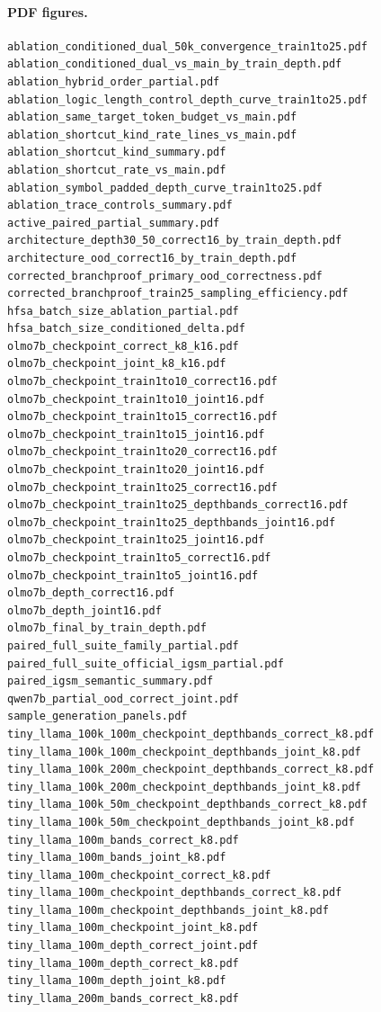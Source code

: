 \documentclass[10pt]{article}
\begin{document}
\paragraph{PDF figures.}
\begin{verbatim}
ablation_conditioned_dual_50k_convergence_train1to25.pdf
ablation_conditioned_dual_vs_main_by_train_depth.pdf
ablation_hybrid_order_partial.pdf
ablation_logic_length_control_depth_curve_train1to25.pdf
ablation_same_target_token_budget_vs_main.pdf
ablation_shortcut_kind_rate_lines_vs_main.pdf
ablation_shortcut_kind_summary.pdf
ablation_shortcut_rate_vs_main.pdf
ablation_symbol_padded_depth_curve_train1to25.pdf
ablation_trace_controls_summary.pdf
active_paired_partial_summary.pdf
architecture_depth30_50_correct16_by_train_depth.pdf
architecture_ood_correct16_by_train_depth.pdf
corrected_branchproof_primary_ood_correctness.pdf
corrected_branchproof_train25_sampling_efficiency.pdf
hfsa_batch_size_ablation_partial.pdf
hfsa_batch_size_conditioned_delta.pdf
olmo7b_checkpoint_correct_k8_k16.pdf
olmo7b_checkpoint_joint_k8_k16.pdf
olmo7b_checkpoint_train1to10_correct16.pdf
olmo7b_checkpoint_train1to10_joint16.pdf
olmo7b_checkpoint_train1to15_correct16.pdf
olmo7b_checkpoint_train1to15_joint16.pdf
olmo7b_checkpoint_train1to20_correct16.pdf
olmo7b_checkpoint_train1to20_joint16.pdf
olmo7b_checkpoint_train1to25_correct16.pdf
olmo7b_checkpoint_train1to25_depthbands_correct16.pdf
olmo7b_checkpoint_train1to25_depthbands_joint16.pdf
olmo7b_checkpoint_train1to25_joint16.pdf
olmo7b_checkpoint_train1to5_correct16.pdf
olmo7b_checkpoint_train1to5_joint16.pdf
olmo7b_depth_correct16.pdf
olmo7b_depth_joint16.pdf
olmo7b_final_by_train_depth.pdf
paired_full_suite_family_partial.pdf
paired_full_suite_official_igsm_partial.pdf
paired_igsm_semantic_summary.pdf
qwen7b_partial_ood_correct_joint.pdf
sample_generation_panels.pdf
tiny_llama_100k_100m_checkpoint_depthbands_correct_k8.pdf
tiny_llama_100k_100m_checkpoint_depthbands_joint_k8.pdf
tiny_llama_100k_200m_checkpoint_depthbands_correct_k8.pdf
tiny_llama_100k_200m_checkpoint_depthbands_joint_k8.pdf
tiny_llama_100k_50m_checkpoint_depthbands_correct_k8.pdf
tiny_llama_100k_50m_checkpoint_depthbands_joint_k8.pdf
tiny_llama_100m_bands_correct_k8.pdf
tiny_llama_100m_bands_joint_k8.pdf
tiny_llama_100m_checkpoint_correct_k8.pdf
tiny_llama_100m_checkpoint_depthbands_correct_k8.pdf
tiny_llama_100m_checkpoint_depthbands_joint_k8.pdf
tiny_llama_100m_checkpoint_joint_k8.pdf
tiny_llama_100m_depth_correct_joint.pdf
tiny_llama_100m_depth_correct_k8.pdf
tiny_llama_100m_depth_joint_k8.pdf
tiny_llama_200m_bands_correct_k8.pdf

\end{verbatim}
\end{document}
